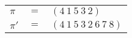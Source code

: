 \begin{example}\label{example:BYQQHUAS}
  \hfill \break
  \begin{tabular}{lll}
    $\pi$  & $=$ & $(4~1~5~3~2)$ \\
    $\pi'$ & $=$ & $(4~1~5~3~2~6~7~8)$ \\
  \end{tabular}
\end{example}